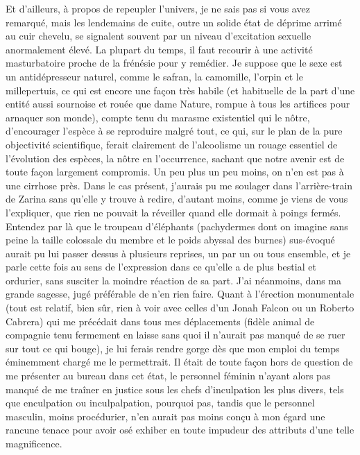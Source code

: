%
Et d’ailleurs, à propos de repeupler l’univers, je ne sais pas si vous avez remarqué, mais les lendemains de cuite, outre un solide état de déprime arrimé au cuir chevelu, se signalent souvent par un niveau d’excitation sexuelle anormalement élevé. La plupart du temps, il faut recourir à une activité masturbatoire proche de la frénésie pour y remédier. Je suppose que le sexe est un antidépresseur naturel, comme le safran, la camomille, l’orpin et le millepertuis, ce qui est encore une façon très habile (et habituelle de la part d’une entité aussi sournoise et rouée que dame Nature, rompue à tous les artifices pour arnaquer son monde), compte tenu du marasme existentiel qui le nôtre, d’encourager l’espèce à se reproduire malgré tout, ce qui, sur le plan de la pure objectivité scientifique, ferait clairement de l’alcoolisme un rouage essentiel de l’évolution des espèces, la nôtre en l’occurrence, sachant que notre avenir est de toute façon largement compromis. Un peu plus un peu moins, on n’en est pas à une cirrhose près. Dans le cas présent, j’aurais pu me soulager dans l’arrière-train de Zarina sans qu’elle y trouve à redire, d’autant moins, comme je viens de vous l’expliquer, que rien ne pouvait la réveiller quand elle dormait à poings fermés. Entendez par là que le troupeau d’éléphants (pachydermes dont on imagine sans peine la taille colossale du membre et le poids abyssal des burnes) sus-évoqué aurait pu lui passer dessus à plusieurs reprises, un par un ou tous ensemble, et je parle cette fois au sens de l’expression dans ce qu’elle a de plus bestial et ordurier, sans susciter la moindre réaction de sa part. J’ai néanmoins, dans ma grande sagesse, jugé préférable de n’en rien faire. Quant à l’érection monumentale (tout est relatif, bien sûr, rien à voir avec celles d’un Jonah Falcon ou un Roberto Cabrera) qui me précédait dans tous mes déplacements (fidèle animal de compagnie tenu fermement en laisse sans quoi il n’aurait pas manqué de se ruer sur tout ce qui bouge), je lui ferais rendre gorge dès que mon emploi du temps éminemment chargé me le permettrait. Il était de toute façon hors de question de me présenter au bureau dans cet état, le personnel féminin n’ayant alors pas manqué de me traîner en justice sous les chefs d’inculpation les plus divers, tels que enculpation ou inculpalpation, pourquoi pas, tandis que le personnel masculin, moins procédurier, n’en aurait pas moins conçu à mon égard une rancune tenace pour avoir osé exhiber en toute impudeur des attributs d’une telle magnificence.

